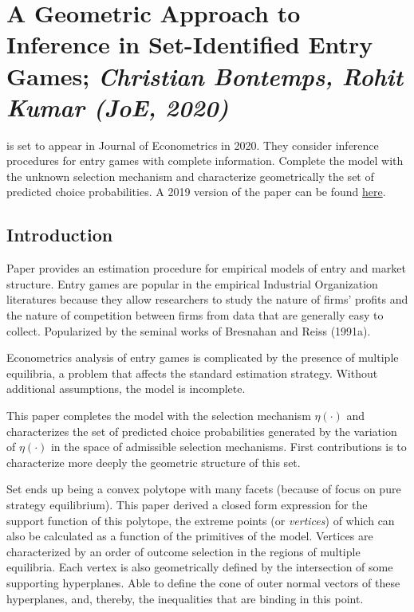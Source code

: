 
\newpage
\section{A Geometric Approach to Inference in Set-Identified Entry Games; \textit{\small Christian Bontemps, Rohit Kumar (JoE, 2020)}}\label{sec:BK-2020}

\citet{BK-2020} is set to appear in Journal of Econometrics in 2020. They consider inference procedures for entry games with complete information. Complete the model with the unknown selection mechanism and characterize geometrically the set of predicted choice probabilities. A 2019 version of the paper can be found 
\href{https://www.cemmap.ac.uk/uploads/Bontemps-Kumar-JofEc-december2019.pdf}{here}.

\subsection{Introduction}

Paper provides an estimation procedure for empirical models of entry and market structure. Entry games are popular in the empirical Industrial Organization literatures because they allow researchers to study the nature of firms' profits and the nature of competition between firms from data that are generally easy to collect. Popularized by the seminal works of Bresnahan and Reiss (1991a). 

Econometrics analysis of entry games is complicated by the presence of multiple equilibria, a problem that affects the standard estimation strategy.  Without additional assumptions, the model is incomplete. 

This paper completes the model with the selection mechanism $\eta(\cdot)$ and characterizes the set of predicted choice probabilities generated by the variation of $\eta(\cdot)$ in the space of admissible selection mechanisms. First contributions is to characterize more deeply the geometric structure of this set. 

Set ends up being a convex polytope with many facets (because of focus on pure strategy equilibrium). This paper derived a closed form expression for the support function of this polytope, the extreme points (or \emph{vertices}) of which can also be calculated as a function of the primitives of the model. Vertices are characterized by an order of outcome selection in the regions of multiple equilibria. Each vertex is also geometrically defined by the intersection of some supporting hyperplanes. Able to define the cone of outer normal vectors of these hyperplanes, and, thereby, the inequalities that are binding in this point.

